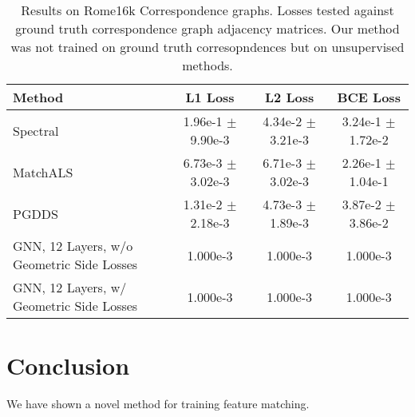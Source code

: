\documentclass[10pt,twocolumn,letterpaper]{article}
\begin{document}
\begin{table*}
\begin{center}
\begin{tabular}{|l|c|c|c|}
\hline
Method & L1 Loss & L2 Loss & BCE Loss \\
\hline\hline\hline
Spectral                                  & 1.96e-1 $\pm$ 9.90e-3 & 4.34e-2 $\pm$ 3.21e-3 & 3.24e-1 $\pm$ 1.72e-2 \\ \hline
MatchALS                                  & 6.73e-3 $\pm$ 3.02e-3 & 6.71e-3 $\pm$ 3.02e-3 & 2.26e-1 $\pm$ 1.04e-1 \\ \hline
PGDDS                                     & 1.31e-2 $\pm$ 2.18e-3 & 4.73e-3 $\pm$ 1.89e-3 & 3.87e-2 $\pm$ 3.86e-2 \\ \hline
GNN, 12 Layers, w/o Geometric Side Losses & 1.000e-3 & 1.000e-3 & 1.000e-3 \\ \hline
GNN, 12 Layers, w/ Geometric Side Losses  & 1.000e-3 & 1.000e-3 & 1.000e-3 \\ \hline

\hline
\end{tabular}
\end{center}
\caption{
Results on Rome16k Correspondence graphs.
Losses tested against ground truth correspondence graph adjacency matrices.
Our method was not trained on ground truth corresopndences but on unsupervised methods.
}
\end{table*}





\section{Conclusion}

We have shown a novel method for training feature matching. 

{\small


}
\end{document}
